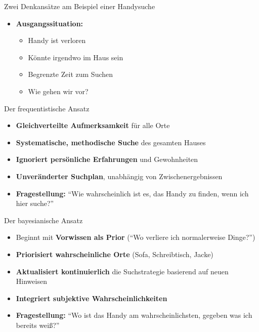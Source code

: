 \documentclass[
  ignorenonframetext,
]{beamer}
\providecommand{\tightlist}{%
  \setlength{\itemsep}{0pt}\setlength{\parskip}{0pt}}
\begin{document}
\begin{frame}{Zwei Denkansätze am Beispiel einer Handysuche}
\protect{}\label{zwei-denkansuxe4tze-am-beispiel-einer-handysuche}
\begin{itemize}
\tightlist
\item
  \textbf{Ausgangssituation:}

  \begin{itemize}
  \tightlist
  \item
    Handy ist verloren
  \item
    Könnte irgendwo im Haus sein
  \item
    Begrenzte Zeit zum Suchen
  \item
    Wie gehen wir vor?
  \end{itemize}
\end{itemize}
\end{frame}

\begin{frame}{Der frequentistische Ansatz}
\protect{}\label{der-frequentistische-ansatz}
\begin{itemize}
\tightlist
\item
  \textbf{Gleichverteilte Aufmerksamkeit} für alle Orte
\item
  \textbf{Systematische, methodische Suche} des gesamten Hauses
\item
  \textbf{Ignoriert persönliche Erfahrungen} und Gewohnheiten
\item
  \textbf{Unveränderter Suchplan}, unabhängig von Zwischenergebnissen
\item
  \textbf{Fragestellung:} ``Wie wahrscheinlich ist es, das Handy zu
  finden, wenn ich hier suche?''
\end{itemize}
\end{frame}

\begin{frame}{Der bayesianische Ansatz}
\protect{}\label{der-bayesianische-ansatz}
\begin{itemize}
\tightlist
\item
  Beginnt mit \textbf{Vorwissen als Prior} (``Wo verliere ich
  normalerweise Dinge?'')
\item
  \textbf{Priorisiert wahrscheinliche Orte} (Sofa, Schreibtisch, Jacke)
\item
  \textbf{Aktualisiert kontinuierlich} die Suchstrategie basierend auf
  neuen Hinweisen
\item
  \textbf{Integriert subjektive Wahrscheinlichkeiten}
\item
  \textbf{Fragestellung:} ``Wo ist das Handy am wahrscheinlichsten,
  gegeben was ich bereits weiß?''
\end{itemize}
\end{frame}
\end{document}
